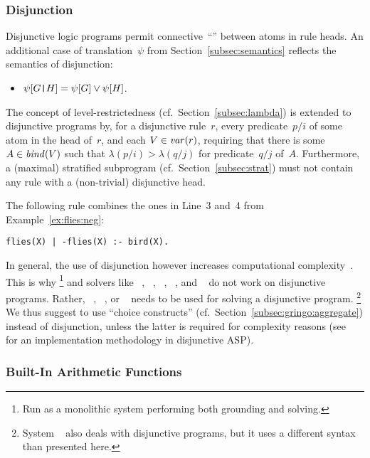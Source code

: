 \subsubsection{Disjunction}\label{subsec:gringo:disjunction}

Disjunctive logic programs permit connective~``\code{|}'' between atoms in rule heads.
An additional case of translation~$\psi$ from Section~\ref{subsec:semantics}
reflects the semantics of disjunction:
\begin{itemize}
\item $\psi[G\code{|}H]=\psi[G]\vee\psi[H]$.
\end{itemize}
%
The concept of level-restrictedness (cf.\ Section~\ref{subsec:lambda}) is extended
to disjunctive programs by,
for a disjunctive rule~$r$, every predicate~$p/i$
of some atom in the head of~$r$, and each $V\in\vars{r}$,
requiring that there is some $A\in\binders{V}{r}$ such that
$\lambda(p/i)>\lambda(q/j)$ for predicate~$q/j$ of~$A$.
Furthermore, a (maximal) stratified subprogram (cf.\ Section~\ref{subsec:strat})
must not contain any rule with a (non-trivial) disjunctive head.

The following rule combines the ones in Line~3 and~4 from Example~\ref{ex:flies:neg}:
\begin{lstlisting}[numbers=none]
flies(X) | -flies(X) :- bird(X).
\end{lstlisting}
In general, the use of disjunction however increases
computational complexity~\cite{eitgot95a}.
This is why \clingo%
\footnote{Run as a monolithic system performing both grounding and solving.}
and solvers like 
\assat~\cite{linzha04a},
\clasp~\cite{gekanesc07b},
\nomorepp~\cite{angelinesc05c},
\smodels~\cite{siniso02a}, and
\smodelscc~\cite{warsch04a}
do not work on disjunctive programs.
Rather,
\claspD~\cite{drgegrkakoossc08a},
\cmodels~\cite{gilima06a,lierler05a}, or
\gnt~\cite{janisesiyo06a}
needs to be used for solving a disjunctive program.%
\footnote{System \dlv~\cite{dlv03a} also deals with disjunctive programs,
  but it uses a different syntax than presented here.}
We thus suggest to use ``choice constructs'' (cf.\ Section~\ref{subsec:gringo:aggregate})
instead of disjunction, unless the latter is required for complexity reasons
(see~\cite{eitpol06a} for an implementation methodology in disjunctive ASP).


\subsubsection{Built-In Arithmetic Functions}\label{subsec:gringo:arith}

